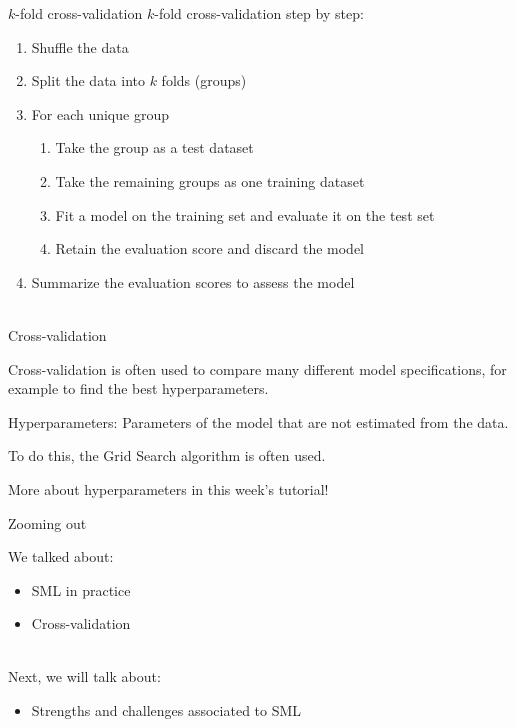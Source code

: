 \documentclass[handout]{beamer}
\begin{document}
\begin{frame}{\(k\)-fold cross-validation}
	\(k\)-fold cross-validation step by step:
	\begin{enumerate}
		\item Shuffle the data
		\item Split the data into \(k\) folds (groups)
		\item For each unique group
		\begin{enumerate}
			\item Take the group as a test dataset
			\item Take the remaining groups as one training dataset
			\item Fit a model on the training set and evaluate it on the test set
			\item Retain the evaluation score and discard the model
		\end{enumerate}
		\item Summarize the evaluation scores to assess the model \\\
	\end{enumerate}

\end{frame}
	

\begin{frame}{Cross-validation}
	
	Cross-validation is often used to compare many different model specifications, for example to find the best hyperparameters.
	
	Hyperparameters: Parameters of the model that are not estimated from the data. 
	
	To do this, the Grid Search algorithm is often used.
	
	More about hyperparameters in this week's tutorial!
	
\end{frame}




\begin{frame}{Zooming out} 
	
	We talked about:
	\begin{itemize}
		\item SML in practice
		\item Cross-validation \\\
	\end{itemize}
	
	Next, we will talk about:
	\begin{itemize}
		\item Strengths and challenges associated to SML
	\end{itemize}
	
\end{frame}
\end{document}
